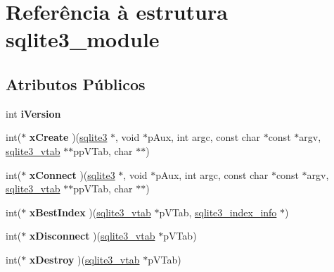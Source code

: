 \hypertarget{structsqlite3__module}{\section{Referência à estrutura sqlite3\-\_\-module}
\label{structsqlite3__module}
}
\subsection*{Atributos Públicos}
\begin{DoxyCompactItemize}
\item 
\hypertarget{structsqlite3__module_a42b11d080dc205aea43581b18f925afe}{int {\bfseries i\-Version}}\label{structsqlite3__module_a42b11d080dc205aea43581b18f925afe}

\item 
\hypertarget{structsqlite3__module_a95e327c9d32abd731013395d9e12b8f9}{int($\ast$ {\bfseries x\-Create} )(\hyperlink{structsqlite3}{sqlite3} $\ast$, void $\ast$p\-Aux, int argc, const char $\ast$const $\ast$argv, \hyperlink{structsqlite3__vtab}{sqlite3\-\_\-vtab} $\ast$$\ast$pp\-V\-Tab, char $\ast$$\ast$)}\label{structsqlite3__module_a95e327c9d32abd731013395d9e12b8f9}

\item 
\hypertarget{structsqlite3__module_acdd9ccc4a6acff230b2d579172ae32d0}{int($\ast$ {\bfseries x\-Connect} )(\hyperlink{structsqlite3}{sqlite3} $\ast$, void $\ast$p\-Aux, int argc, const char $\ast$const $\ast$argv, \hyperlink{structsqlite3__vtab}{sqlite3\-\_\-vtab} $\ast$$\ast$pp\-V\-Tab, char $\ast$$\ast$)}\label{structsqlite3__module_acdd9ccc4a6acff230b2d579172ae32d0}

\item 
\hypertarget{structsqlite3__module_a66577e230ca8de525b30ee6f287eafb1}{int($\ast$ {\bfseries x\-Best\-Index} )(\hyperlink{structsqlite3__vtab}{sqlite3\-\_\-vtab} $\ast$p\-V\-Tab, \hyperlink{structsqlite3__index__info}{sqlite3\-\_\-index\-\_\-info} $\ast$)}\label{structsqlite3__module_a66577e230ca8de525b30ee6f287eafb1}

\item 
\hypertarget{structsqlite3__module_a5dbaa6ff075eaff25ccfddaedba06934}{int($\ast$ {\bfseries x\-Disconnect} )(\hyperlink{structsqlite3__vtab}{sqlite3\-\_\-vtab} $\ast$p\-V\-Tab)}\label{structsqlite3__module_a5dbaa6ff075eaff25ccfddaedba06934}

\item 
\hypertarget{structsqlite3__module_a296dae8dadd4eb1f7d0f1187650c7aa5}{int($\ast$ {\bfseries x\-Destroy} )(\hyperlink{structsqlite3__vtab}{sqlite3\-\_\-vtab} $\ast$p\-V\-Tab)}\label{structsqlite3__module_a296dae8dadd4eb1f7d0f1187650c7aa5}


\end{DoxyCompactItemize}
